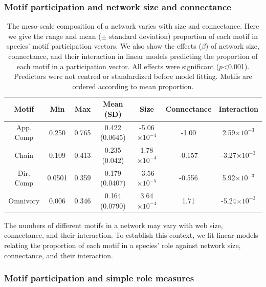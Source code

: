 \documentclass[12pt]{article}
\begin{document}
\begin{spacing}{2.0}
        \subsubsection*{Motif participation and network size and connectance}
        
        
            \begin{table}[hb!]
            \centering
            \caption{The meso-scale composition of a network varies with size and connectance. Here we give the range and mean ($\pm$ standard deviation) proportion of each motif in species' motif participation vectors. 
            We also show the effects ($\beta$) of network size, connectance, and their interaction in linear models predicting the proportion of each motif in a participation vector.
            All effects were significant ($p$\textless0.001).
            Predictors were not centred or standardized before model fitting. Motifs are ordered according to mean proportion.}
            \label{tab:partic_vs_SC}   
            \footnotesize
            \begin{tabular}{c|c c c | c c c}
                Motif & Min & Max & Mean (SD) & Size & Connectance & Interaction \\
                \hline
                App. Comp & 0.250 & 0.765 & 0.422 (0.0645) & -5.06$\times10^{-4}$ & -1.00 & 2.59$\times10^{-3}$ \\
                Chain & 0.109 & 0.413 & 0.235 (0.042) & 1.78$\times10^{-4}$ & -0.157 & -3.27$\times10^{-3}$ \\
                Dir. Comp & 0.0501 & 0.359 & 0.179 (0.0407) & -3.56$\times10^{-5}$ & -0.556 & 5.92$\times10^{-3}$ \\
                Omnivory & 0.006 & 0.346 & 0.164 (0.0790) & 3.64$\times10^{-4}$ & 1.71 & -5.24$\times10^{-3}$ \\   
                \hline
                \end{tabular}
                \end{table}

        The numbers of different motifs in a network may vary with web size, connectance, and their interaction.
        To establish this context, we fit linear models relating the proportion of each motif in a species' role against network size, connectance, and their interaction.
    
        \subsubsection*{Motif participation and simple role measures}
        

\end{spacing}
\end{document}
